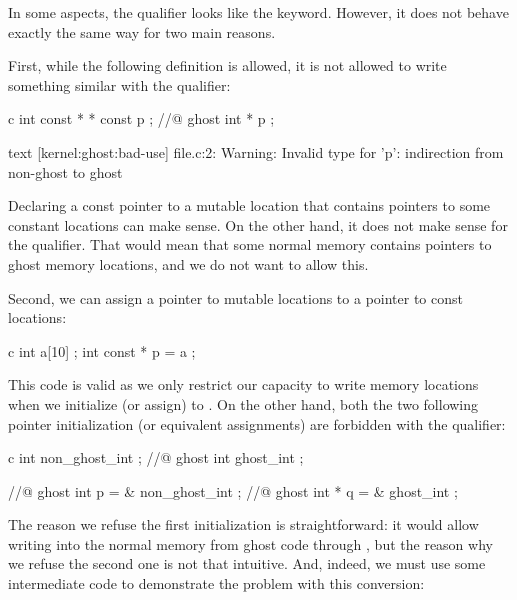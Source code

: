 

In some aspects, the  qualifier
looks like the  keyword. However, it does not
behave exactly the same way for two main reasons.


First, while the following  definition is allowed,
it is not allowed to write something similar with the
 qualifier:


\begin{CodeBlock}{c}
int const * * const p ;
//@ ghost int \ghost * * p ;
\end{CodeBlock}


\begin{CodeBlock}{text}
[kernel:ghost:bad-use] file.c:2: Warning:
  Invalid type for 'p': indirection from non-ghost to ghost
\end{CodeBlock}


Declaring a const pointer to a mutable location that contains pointers
to some constant locations can make sense. On the other hand, it does
not make sense for the  qualifier. That
would mean that some normal memory contains pointers to ghost memory
locations, and we do not want to allow this.


Second, we can assign a pointer to mutable locations to a pointer to
const locations:


\begin{CodeBlock}{c}
int a[10] ;
int const * p = a ;
\end{CodeBlock}


This code is valid as we only restrict our capacity to write memory
locations when we initialize (or assign)  to .
On the other hand, both the two following pointer initialization
(or equivalent assignments) are forbidden with the
 qualifier:


\begin{CodeBlock}{c}
int non_ghost_int ;
//@ ghost int ghost_int ;

//@ ghost int \ghost * p = & non_ghost_int ;
//@ ghost int * q = & ghost_int ;
\end{CodeBlock}


The reason we refuse the first initialization is straightforward:
it would allow writing into the normal memory from ghost code through
, but the reason why we refuse the second one is not that
intuitive. And, indeed, we must use some intermediate code to
demonstrate the problem with this conversion:


